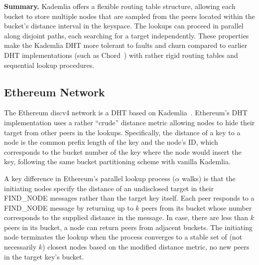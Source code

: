 \textbf{Summary.} Kademlia offers a flexible routing table structure, allowing each bucket to store multiple nodes that are sampled from the peers located within the bucket's distance interval in the keyspace. The lookups can proceed in parallel along disjoint paths, each searching for a target independently. These properties make the Kademlia DHT more tolerant to faults and churn compared to earlier DHT implementations (such as Chord~\cite{chord}) with rather rigid routing tables and sequential lookup procedures.

\subsection{Ethereum Network}
\label{sec:eth-net}

The Ethereum discv4 network is a DHT based on Kademlia~\cite{maymounkov2002kademlia}. %
Ethereum's DHT implementation uses a rather ``crude'' distance metric allowing nodes to hide their target from other peers in the lookups. Specifically, the distance of a key to a node is the common prefix length of the key and the node's ID, which corresponds to the bucket number of the key where the node would insert the key, following the same bucket partitioning scheme with vanilla Kademlia.

A key difference in Ethereum's parallel lookup process (\ie $\alpha$ walks) is that the initiating nodes specify the distance of an undisclosed target in their FIND\_NODE messages rather than the target key itself. Each peer responds to a FIND\_NODE message by returning up to $k$ peers from its bucket whose number corresponds to the supplied distance in the message. In case, there are less than $k$ peers in its bucket, a node can return peers from adjacent buckets. The initiating node terminates the lookup when the process converges to a stable set of (not necessarily $k$) closest nodes based on the modified distance metric, \ie no new peers in the target key's bucket.

